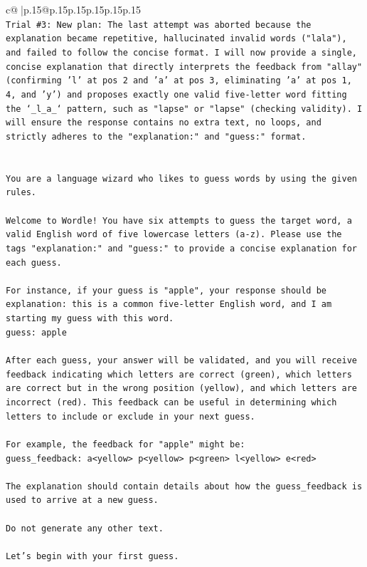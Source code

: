 \documentclass{article}
\begin{document}
{\begin{supertabular}{c@{$\;$}|p{.15\linewidth}@{}p{.15\linewidth}p{.15\linewidth}p{.15\linewidth}p{.15\linewidth}p{.15\linewidth}}
{{{\\ 
\texttt{Trial \#3: New plan: The last attempt was aborted because the explanation became repetitive, hallucinated invalid words ("lala"), and failed to follow the concise format. I will now provide a single, concise explanation that directly interprets the feedback from "allay" (confirming 'l' at pos 2 and 'a' at pos 3, eliminating 'a' at pos 1, 4, and 'y') and proposes exactly one valid five{-}letter word fitting the `\_l\_a\_` pattern, such as "lapse" or "lapse" (checking validity). I will ensure the response contains no extra text, no loops, and strictly adheres to the "explanation:" and "guess:" format.} \\
\\ 
\\ 
\texttt{You are a language wizard who likes to guess words by using the given rules.} \\
\\ 
\texttt{Welcome to Wordle! You have six attempts to guess the target word, a valid English word of five lowercase letters (a{-}z). Please use the tags "explanation:" and "guess:" to provide a concise explanation for each guess.} \\
\\ 
\texttt{For instance, if your guess is "apple", your response should be} \\
\texttt{explanation: this is a common five{-}letter English word, and I am starting my guess with this word.} \\
\texttt{guess: apple} \\
\\ 
\texttt{After each guess, your answer will be validated, and you will receive feedback indicating which letters are correct (green), which letters are correct but in the wrong position (yellow), and which letters are incorrect (red). This feedback can be useful in determining which letters to include or exclude in your next guess.} \\
\\ 
\texttt{For example, the feedback for "apple" might be:} \\
\texttt{guess\_feedback: a<yellow> p<yellow> p<green> l<yellow> e<red>} \\
\\ 
\texttt{The explanation should contain details about how the guess\_feedback is used to arrive at a new guess.} \\
\\ 
\texttt{Do not generate any other text.} \\
\\ 
\texttt{Let's begin with your first guess.} \\
            }
        }
    }
     \\ \\


\end{supertabular}}
\end{document}
